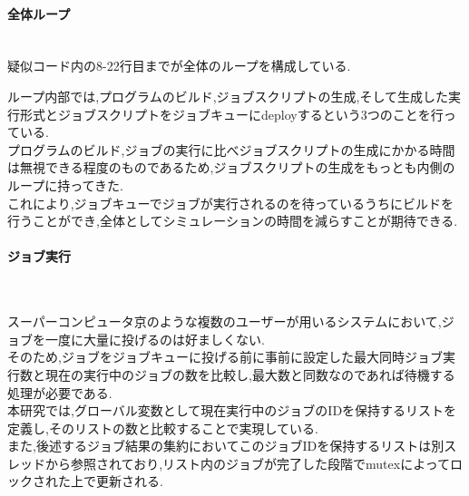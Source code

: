 \paragraph{全体ループ}~\\
疑似コード内の8-22行目までが全体のループを構成している.\\
{\footnotesize

}
ループ内部では,プログラムのビルド,ジョブスクリプトの生成,そして生成した実行形式とジョブスクリプトをジョブキューにdeployするという3つのことを行っている.\\
プログラムのビルド,ジョブの実行に比べジョブスクリプトの生成にかかる時間は無視できる程度のものであるため,ジョブスクリプトの生成をもっとも内側のループに持ってきた.\\
これにより,ジョブキューでジョブが実行されるのを待っているうちにビルドを行うことができ,全体としてシミュレーションの時間を減らすことが期待できる.\\
\paragraph{ジョブ実行}~\\
{\footnotesize

}
スーパーコンピュータ京のような複数のユーザーが用いるシステムにおいて,ジョブを一度に大量に投げるのは好ましくない.\\
そのため,ジョブをジョブキューに投げる前に事前に設定した最大同時ジョブ実行数と現在の実行中のジョブの数を比較し,最大数と同数なのであれば待機する処理が必要である.\\
本研究では,グローバル変数として現在実行中のジョブのIDを保持するリストを定義し,そのリストの数と比較することで実現している.\\
また,後述するジョブ結果の集約においてこのジョブIDを保持するリストは別スレッドから参照されており,リスト内のジョブが完了した段階でmutexによってロックされた上で更新される.\\
